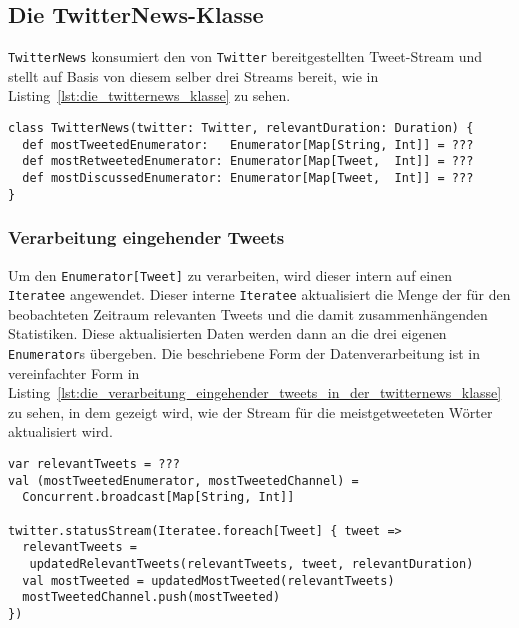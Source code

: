 
\subsection{Die TwitterNews-Klasse} %
\label{sub:die_twitternews_klasse}

\lstinline|TwitterNews| konsumiert den von \lstinline|Twitter| bereitgestellten Tweet-Stream und stellt auf Basis von diesem selber drei Streams bereit, wie in Listing~\ref{lst:die_twitternews_klasse} zu sehen.

\begin{lstlisting}[caption=Die TwitterNews-Klasse, label=lst:die_twitternews_klasse]
class TwitterNews(twitter: Twitter, relevantDuration: Duration) {
  def mostTweetedEnumerator:   Enumerator[Map[String, Int]] = ???
  def mostRetweetedEnumerator: Enumerator[Map[Tweet,  Int]] = ???
  def mostDiscussedEnumerator: Enumerator[Map[Tweet,  Int]] = ???
}
\end{lstlisting}

\subsubsection{Verarbeitung eingehender Tweets} %
\label{ssub:verarbeitung_eingehender_tweets}

Um den \lstinline|Enumerator[Tweet]| zu verarbeiten, wird dieser intern auf einen \lstinline|Iteratee| angewendet.
Dieser interne \lstinline|Iteratee| aktualisiert die Menge der für den beobachteten Zeitraum relevanten Tweets und die damit zusammenhängenden Statistiken.
Diese aktualisierten Daten werden dann an die drei eigenen \lstinline|Enumerator|s übergeben.
Die beschriebene Form der Datenverarbeitung ist in vereinfachter Form in Listing~\ref{lst:die_verarbeitung_eingehender_tweets_in_der_twitternews_klasse} zu sehen, in dem gezeigt wird, wie der Stream für die meistgetweeteten Wörter aktualisiert wird.

\begin{lstlisting}[caption=Die Verarbeitung eingehender Tweets in der TwitterNews-Klasse, label=lst:die_verarbeitung_eingehender_tweets_in_der_twitternews_klasse]
var relevantTweets = ???
val (mostTweetedEnumerator, mostTweetedChannel) =
  Concurrent.broadcast[Map[String, Int]]

twitter.statusStream(Iteratee.foreach[Tweet] { tweet =>
  relevantTweets =
   updatedRelevantTweets(relevantTweets, tweet, relevantDuration)
  val mostTweeted = updatedMostTweeted(relevantTweets)
  mostTweetedChannel.push(mostTweeted)
})
\end{lstlisting}

